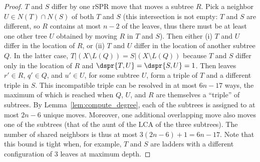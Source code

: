 \documentclass[11pt,onecolumn,conference]{IEEEtran}
\begin{document}
\sharedneighbors*
\begin{proof}
	$T$ and $S$ differ by one rSPR move that moves a subtree $R$.
	Pick a neighbor $U \in N(T) \cap N(S)$ of both $T$ and $S$ (this intersection is not empty: $T$ and $S$ are different, so $R$ contains at most $n-2$ of the leaves, thus there must be at least one other tree $U$ obtained by moving $R$ in $T$ and $S$).
	Then either (i) $T$ and $U$ differ in the location of $R$, or (ii) $T$ and $U$ differ in the location of another subtree $Q$.
	In the latter case, $T|(X \setminus L(Q)) = S|(X \setminus L(Q))$ because $T$ and $S$ differ only in the location of $R$ and $\dspr{T,U} = \dspr{S,U} = 1$.
	Then leaves $r' \in R$, $q' \in Q$, and $u' \in U$, for some subtree $U$, form a triple of $T$ and a different triple in $S$.
	This incompatible triple can be resolved in at most $6n - 17$ ways, the maximum of which is reached when $Q$, $U$, and $R$ are themselves a ``triple'' of subtrees.
	By Lemma~\ref{lem:compute_degree}, each of the subtrees is assigned to at most $2n-6$ unique moves.
	Moreover, one additional overlapping move also moves one of the subtrees (that of the aunt of the LCA of the three subtrees).
	The number of shared neighbors is thus at most $3(2n-6) + 1 = 6n-17$.
	Note that this bound is tight when, for example, $T$ and $S$ are ladders with a different configuration of 3 leaves at maximum depth.
\end{proof}
\end{document}
